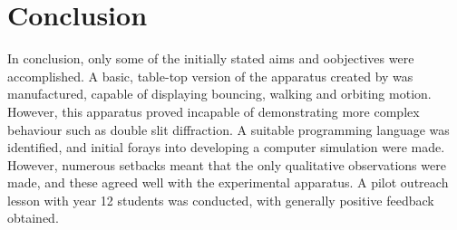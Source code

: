 \section{Conclusion}



In conclusion, only some of the initially stated aims and oobjectives were accomplished. A basic, table-top version of the apparatus created by \cite{couder} was manufactured, capable of displaying bouncing, walking and orbiting motion. However, this apparatus proved incapable of demonstrating more complex behaviour such as double slit diffraction. A suitable programming language was identified, and initial forays into developing a computer simulation were made. However, numerous setbacks meant that the only qualitative observations were made, and these agreed well with the experimental apparatus. A pilot outreach lesson with year 12 students was conducted, with generally positive feedback obtained.  